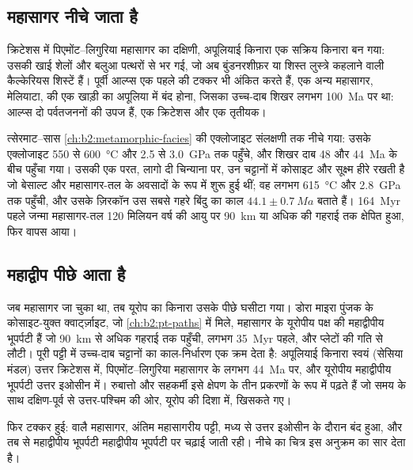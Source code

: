 \subsection*{महासागर नीचे जाता है}

क्रिटेशस में पिएमोंट--लिगुरिया महासागर का दक्षिणी, अपूलियाई किनारा एक
सक्रिय किनारा बन गया: उसकी खाई शेलों और बलुआ पत्थरों से भर गई, जो अब बुंडनरशीफ़र या शिस्त लुस्त्रे
कहलाने वाली कैल्केरियस शिस्टें हैं। पूर्वी आल्प्स एक पहले की
टक्कर भी अंकित करते हैं, एक अन्य महासागर, मेलियाटा, की एक खाड़ी का अपूलिया में बंद होना, जिसका
उच्च-दाब शिखर लगभग \qty{100}{Ma} पर था: आल्प्स दो पर्वतजननों की उपज हैं, एक
क्रिटेशस और एक तृतीयक।

त्सेरमाट--सास  \cref{ch:b2:metamorphic-facies} की एक्लोजाइट संलक्षणी तक
नीचे गया: उसके एक्लोजाइट 550 से \qty{600}{\celsius} और 2.5 से
\qty{3.0}{GPa} तक पहुँचे, और शिखर दाब 48 और \qty{44}{Ma} के बीच पहुँचा गया। उसकी एक परत,
लागो दी चिन्याना पर, उन चट्टानों में कोसाइट और सूक्ष्म हीरे रखती है जो बेसाल्ट
और महासागर-तल के अवसादों के रूप में शुरू हुई थीं; वह लगभग \qty{615}{\celsius} और \qty{2.8}{GPa} तक पहुँची, और उसके
ज़िरकॉन उस सबसे गहरे बिंदु का काल $44.1 \pm \qty{0.7}{Ma}$ बताते हैं। \qty{164}{Myr} पहले जन्मा
महासागर-तल 120 मिलियन वर्ष की आयु पर
\qty{90}{km} या अधिक की गहराई तक क्षेपित हुआ, फिर वापस आया।

\subsection*{महाद्वीप पीछे आता है}

जब महासागर जा चुका था, तब यूरोप का किनारा उसके पीछे घसीटा गया। डोरा माइरा पुंजक के कोसाइट-युक्त
क्वार्ट्ज़ाइट, जो \cref{ch:b2:pt-paths} में मिले, महासागर के यूरोपीय पक्ष की महाद्वीपीय भूपर्पटी हैं
जो \qty{90}{km} से अधिक गहराई तक पहुँची, लगभग
\qty{35}{Myr} पहले, और प्लेटों की गति से लौटी। पूरी पट्टी में उच्च-दाब चट्टानों का काल-निर्धारण
एक क्रम देता है: अपूलियाई किनारा स्वयं (सेसिया मंडल) उत्तर
क्रिटेशस में, पिएमोंट--लिगुरिया महासागर के  लगभग \qty{44}{Ma} पर, और
यूरोपीय महाद्वीपीय भूपर्पटी उत्तर इओसीन में। रुबात्तो और सहकर्मी इसे क्षेपण के तीन प्रकरणों के रूप में पढ़ते हैं जो समय के साथ
दक्षिण-पूर्व से उत्तर-पश्चिम की ओर, यूरोप की दिशा में, खिसकते गए।

फिर टक्कर हुई: वालै महासागर, अंतिम महासागरीय पट्टी, मध्य से
उत्तर इओसीन के दौरान बंद हुआ, और तब से महाद्वीपीय भूपर्पटी महाद्वीपीय भूपर्पटी पर चढ़ाई जाती रही।
नीचे का चित्र इस अनुक्रम का सार देता है।

